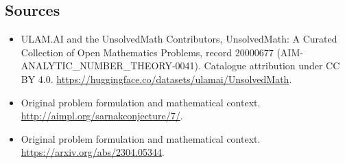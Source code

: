 \documentclass[11pt]{article}
\begin{document}
\subsection{Sources}
\begin{itemize}
\item[\hypertarget{source:20000677:1}{S1}] ULAM.AI and the UnsolvedMath Contributors, UnsolvedMath: A Curated Collection of Open Mathematics Problems, record 20000677 (AIM-ANALYTIC\_NUMBER\_THEORY-0041). Catalogue attribution under CC BY 4.0.
\url{https://huggingface.co/datasets/ulamai/UnsolvedMath}.
\item[\hypertarget{source:20000677:2}{S2}] Original problem formulation and mathematical context.
\url{http://aimpl.org/sarnakconjecture/7/}.
\item[\hypertarget{source:20000677:3}{S3}] Original problem formulation and mathematical context.
\url{https://arxiv.org/abs/2304.05344}.
\end{itemize}
\label{end:20000677}
\end{document}
